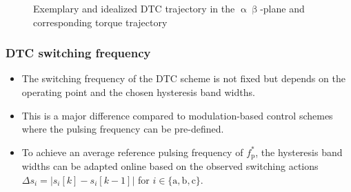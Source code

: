 \begin{frame}
\begin{figure}
{%
        }
        \caption{Exemplary and idealized DTC trajectory in the $\upalpha\upbeta$-plane and corresponding torque trajectory}
        \label{fig:DTC_example}
    \end{figure}
\end{frame}

\begin{frame}
    \frametitle{DTC switching frequency}
    \begin{itemize}
        \item<1-> The switching frequency of the DTC scheme is not fixed but depends on the operating point and the chosen hysteresis band widths.
        \item<2-> This is a major difference compared to modulation-based control schemes where the pulsing frequency can be pre-defined.
        \item<3-> To achieve an average reference pulsing frequency of $f^*_\mathrm{p}$, the hysteresis band widths can be adapted online based on the observed switching actions $\Delta s_i = \left| s_i[k] - s_i[k-1]\right|$ for $i \in \{\mathrm{a},\mathrm{b},\mathrm{c}\}$.
    \end{itemize}
\end{frame}
